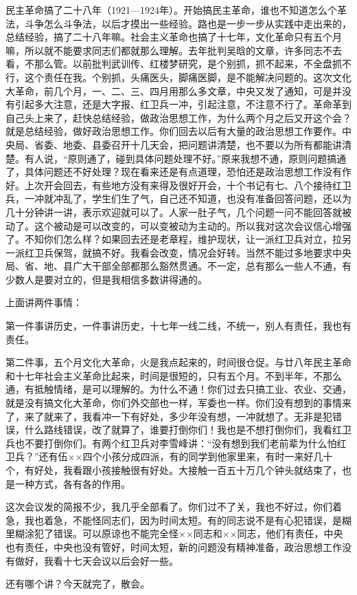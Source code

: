 民主革命搞了二十八年（1921—1924年）。开始搞民主革命，谁也不知道怎么个革法，斗争怎么斗争法，以后才摸出一些经验。路也是一步一步从实践中走出来的，总结经验，搞了二十八年嘛。社会主义革命也搞了十七年，文化革命只有五个月嘛，所以就不能要求同志们都就那么理解。去年批判吴晗的文章，许多同志不去看，不那么管。以前批判武训传、红楼梦研究，是个别抓，抓不起来，不全盘抓不行，这个责任在我。个别抓，头痛医头，脚痛医脚，是不能解决问题的。这次文化大革命，前几个月，一、二、三、四月用那么多文章，中央又发了通知，可是并没有引起多大注意，还是大字报、红卫兵一冲，引起注意，不注意不行了。革命革到自己头上来了，赶快总结经验，做政治思想工作，为什么两个月之后又开这个会？就是总结经验，做好政治思想工作。你们回去以后有大量的政治思想工作要作。中央局、省委、地委、县委召开十几天会，把问题讲清楚，也不要以为所有都能讲清楚。有人说，“原则通了，碰到具体问题处理不好。”原来我想不通，原则问题搞通了，具体问题还不好处理？现在看来还是有点道理，恐怕还是政治思想工作没有作好。上次开会回去，有些地方没有来得及很好开会，十个书记有七、八个接待红卫兵，一冲就冲乱了，学生们生了气，自己还不知道，也没有准备回答问题，还以为几十分钟讲一讲，表示欢迎就可以了。人家一肚子气，几个问题一问不能回答就被动了。这个被动是可以改变的，可以变被动为主动的。所以我对这次会议信心增强了。不知你们怎么样？如果回去还是老章程，维护现状，让一派红卫兵对立，拉另一派红卫兵保驾，就搞不好。我看会改变，情况会好转。当然不能过多地要求中央局、省、地、县广大干部全部都那么豁然贯通。不一定，总有那么一些人不通，有少数人是要对立的，但是我相信多数讲得通的。

上面讲两件事情：

第一件事讲历史，一件事讲历史，十七年一线二线，不统一，别人有责任，我也有责任。

第二件事，五个月文化大革命，火是我点起来的，时间很仓促。与廿八年民主革命和十七年社会主义革命比起来，时间是很短的，只有五个月。不到半年，不那么通，有抵触情绪，是可以理解的。为什么不通！你们过去只搞工业、农业、交通，就是没有搞文化大革命，你们外交部也一样，军委也一样。你们没有想到的事情来了，来了就来了，我看冲一下有好处，多少年没有想，一冲就想了。无非是犯错误，什么路线错误，改了就算了，谁要打倒你们！我也是不想打倒你们，我看红卫兵也不要打倒你们。有两个红卫兵对李雪峰讲：“没有想到我们老前辈为什么怕红卫兵？”还有伍××四个小孩分成四派，有的同学到他家里来，有时一来好几十个，有好处，我看跟小孩接触很有好处。大接触一百五十万几个钟头就结束了，也是一种方式，各有各的作用。

这次会议发的简报不少，我几乎全部看了。你们过不了关，我也不好过，你们着急，我也着急，不能怪同志们，因为时间太短。有的同志说不是有心犯错误，是糊里糊涂犯了错误。可以原谅也不能完全怪××同志和××同志，他们有责任，中央也有责任，中央也没有管好，时间太短，新的问题没有精神准备，政治思想工作没有做好，我看十七天会议以后会好一些。

还有哪个讲？今天就完了，散会。


